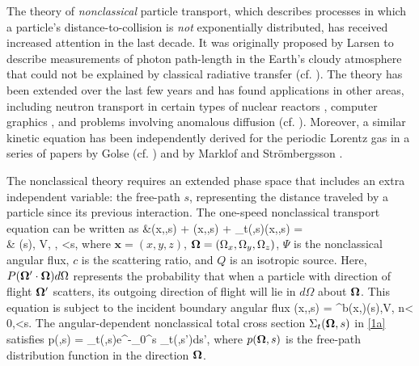 \documentclass[preprint,12pt]{elsarticle}
\def\bal#1\nal{\begin{align}#1\end{align}}
\def\bsub#1\nsub{\begin{subequations}#1\end{subequations}}
\newcommand{\f}{\frac}
\newcommand{\ux}{{\bm x}}
\newcommand{\un}{{\bm n}}
\newcommand{\unab}{{\bf \nabla}}
\newcommand{\uom}{{\bf \Omega}}
\begin{document}
The theory of \textit{nonclassical} particle transport, which describes processes in which a particle's distance-to-collision is \textit{not} exponentially distributed, has received increased attention in the last decade.
It was originally proposed by Larsen \cite{lar_07} to describe measurements of photon path-length in the Earth's cloudy atmosphere that could not be explained by classical radiative transfer (cf. \cite{davmar_10}).
The theory has been extended over the last few years \cite{larvas_11,fragou_10,vaslar_14a,davxu_14,xudav_16} and has found applications in other areas, including neutron transport in certain types of nuclear reactors \cite{vaslar_09,vas_13,vaslar_14b}, computer graphics \cite{deo_14}, and problems involving anomalous diffusion (cf. \cite{frasun_16}).
Moreover, a similar kinetic equation has been independently derived for the periodic Lorentz gas in a series of papers by Golse (cf. \cite{gol_12}) and by Marklof and Str\" ombergsson \cite{marstr_10,marstr_11,marstr_14,marstr_15}.

The nonclassical theory requires an extended phase space that includes an extra independent variable: the free-path $s$, representing the distance traveled by a particle since its previous interaction.
The one-speed nonclassical transport equation can be written as \cite{vaslar_14a}
\bsub\label[pluraleq]{1}
\bal
\f{\partial }{\partial s}&\Psi(\ux,\uom,s) + \uom\cdot\unab\Psi(\ux,\uom,s) + \Sigma_t(\uom,s)\Psi (\ux,\uom,s) = \label{1a}\\
& \delta(s)\left[c\int_{4\pi}\int_0^{\infty}P(\uom'\cdot\uom)\Sigma_t(\uom',s')\Psi(\ux,\uom',s')d\Omega' ds' + \f{Q(\ux)}{4\pi}\right], \quad \ux \in V,\; \uom {}\pi, <s,\nonumber
\nal
where $\ux=(x,y,z)$, $\uom = (\Omega_x,\Omega_y,\Omega_z)$, $\Psi$ is the nonclassical angular flux, $c$ is the scattering ratio, and $Q$ is an isotropic source.
Here, $P(\uom'\cdot\uom)d\Omega$ represents the probability that when a particle with direction of flight $\uom'$ scatters, its outgoing direction of flight will lie in $d\Omega$ about $\uom$.
This equation is subject to the incident boundary angular flux \cite{larfra_17}
\bal
\Psi(\ux,\uom,s) = \Psi^{b}(\ux,\uom)\delta(s),\quad \ux\in\partial V, \; \un\cdot\uom < 0,<s.
\nal
\nsub
The angular-dependent nonclassical total cross section $\Sigma_t(\uom,s)$ in \cref{1a} satisfies
\bal\label{2}
p(\uom,s) = \Sigma_t(\uom,s)e^{-\int_0^s \Sigma_t(\uom,s')ds'},
\nal
where $p(\uom,s)$ is the free-path distribution function in the direction $\uom$.
\end{document}
